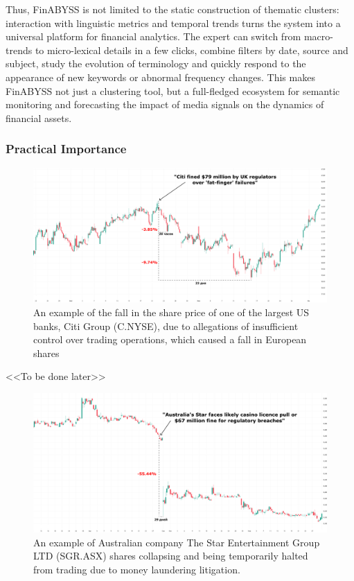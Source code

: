 Thus, FinABYSS is not limited to the static construction of thematic clusters: interaction with linguistic metrics
and temporal trends turns the system into a universal platform for financial analytics. The expert can switch from
macro-trends to micro-lexical details in a few clicks, combine filters by date, source and subject, study the evolution
of terminology and quickly respond to the appearance of new keywords or abnormal frequency changes. This makes FinABYSS
not just a clustering tool, but a full-fledged ecosystem for semantic monitoring and forecasting the impact of media
signals on the dynamics of financial assets.

\subsubsection{Practical Importance}

\begin{figure}[H]
    \centering
    \includegraphics[width=1\linewidth]{img/citi_group.png}
    \caption{An example of the fall in the share price of one of the largest US banks, Citi Group
    (C.NYSE), due to allegations of insufficient control over trading operations, which caused
    a fall in European shares}
    \label{fig:citi_group}
\end{figure}

<<To be done later>>

\begin{figure}[H]
    \centering
    \includegraphics[width=1\linewidth]{img/star_entertainment.png}
    \caption{An example of Australian company The Star Entertainment Group LTD (SGR.ASX) shares
    collapsing and being temporarily halted from trading due to money laundering litigation.}
    \label{fig:star_entertainment}
\end{figure}